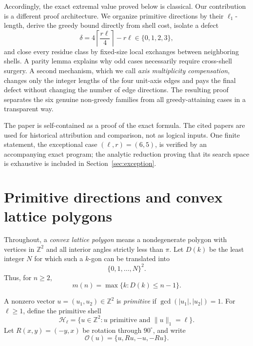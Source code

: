 \documentclass[11pt]{article}
\theoremstyle{definition}
\newcommand{\Z}{\mathbb Z}
\newcommand{\HH}{\mathcal H}
\begin{document}
Accordingly, the exact extremal value proved below is classical.  Our contribution is a different proof architecture.  We organize primitive directions by their \(\ell_1\)-length, derive the greedy bound directly from shell cost, isolate a defect
\[
\delta=4\left\lceil\frac{r\ell}{4}\right\rceil-r\ell\in\{0,1,2,3\},
\]
and close every residue class by fixed-size local exchanges between neighboring shells.  A parity lemma explains why odd cases necessarily require cross-shell surgery.  A second mechanism, which we call \emph{axis multiplicity compensation}, changes only the integer lengths of the four unit-axis edges and pays the final defect without changing the number of edge directions.  The resulting proof separates the six genuine non-greedy families from all greedy-attaining cases in a transparent way.

The paper is self-contained as a proof of the exact formula.  The cited papers are used for historical attribution and comparison, not as logical inputs.  One finite statement, the exceptional case \((\ell,r)=(6,5)\), is verified by an accompanying exact program; the analytic reduction proving that its search space is exhaustive is included in Section~\ref{sec:exception}.

\section{Primitive directions and convex lattice polygons}

Throughout, a \emph{convex lattice polygon} means a nondegenerate polygon with vertices in \(\Z^2\) and all interior angles strictly less than \(\pi\).  Let \(D(k)\) be the least integer \(N\) for which such a \(k\)-gon can be translated into
\[
\{0,1,\ldots,N\}^2.
\]
Thus, for \(n\ge2\),
\begin{equation}\label{eq:inverse}
m(n)=\max\{k:D(k)\le n-1\}.
\end{equation}

A nonzero vector \(u=(u_1,u_2)\in\Z^2\) is \emph{primitive} if
\(\gcd(|u_1|,|u_2|)=1\).  For \(\ell\ge1\), define the primitive shell
\[
\HH_\ell=\{u\in\Z^2:u\text{ primitive and }\|u\|_1=\ell\}.
\]
Let \(R(x,y)=(-y,x)\) be rotation through \(90^\circ\), and write
\[
\mathcal O(u)=\{u,Ru,-u,-Ru\}.
\]
\end{document}

